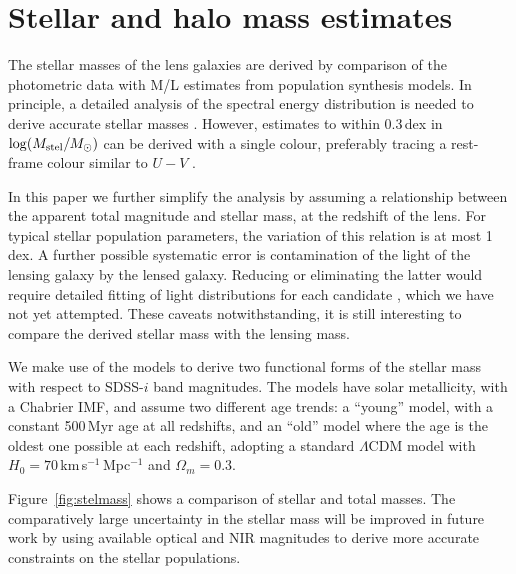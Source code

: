 \section{Stellar and halo mass estimates}\label{sec:stellar-mass}

The stellar masses of the lens galaxies are derived by comparison of
the photometric data with M/L estimates from population synthesis
models.  In principle, a detailed analysis of the spectral energy
distribution is needed to derive accurate stellar masses
\citep[e.g.][]{2009ApJS..185..253G,2011MNRAS.418.1587T}.  However,
estimates to within 0.3\,dex in $\log(M_\text{stel}/M_\odot)$ can be derived
with a single colour, preferably tracing a rest-frame colour similar
to $U-V$ \citep[see Fig.~1 of][]{2008MNRAS.383..857F}. 

In this paper we further simplify the analysis by assuming a
relationship between the apparent total magnitude and stellar mass, at
the redshift of the lens.  For typical stellar population parameters,
the variation of this relation is at most 1\,dex.  A further possible
systematic error is contamination of the light of the lensing galaxy
by the lensed galaxy.  Reducing or eliminating the latter would
require detailed fitting of light distributions for each candidate
\citep[see][]{2011ApJ...740...97L}, which we have not yet attempted.  These 
caveats notwithstanding, it is still interesting to compare the derived
stellar mass with the lensing mass.

We make use of the \citet{2003MNRAS.344.1000B} models to derive two
functional forms of the stellar mass with respect to SDSS-$i$ band
magnitudes. The models have solar metallicity, with a Chabrier IMF,
and assume two different age trends: a ``young'' model, with a
constant 500\,Myr age at all redshifts, and an ``old'' model where the
age is the oldest one possible at each redshift, adopting a standard
$\Lambda$CDM model with $H_0=70$\,km\,s$^{-1}$\,Mpc$^{-1}$ and
$\Omega_m=0.3$.

Figure~\ref{fig:stelmass} shows a comparison of stellar and total
masses.  The comparatively large uncertainty in the stellar mass will
be improved in future work by using available optical and NIR
magnitudes to derive more accurate constraints on the stellar
populations.


